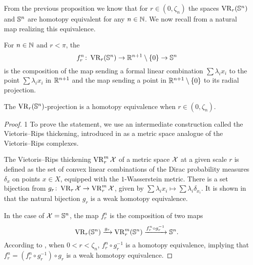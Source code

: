 From the previous proposition we know that for \(r \in (0, \zeta_n)\) the spaces \(\operatorname{VR}_r(\mathbb{S}^n)\) and \(\mathbb{S}^n\) are homotopy equivalent for any \(n \in \mathbb{N}\).
We now recall from \cite{bibid} a natural map realizing this equivalence.

For \(n \in \mathbb{N}\) and \(r < \pi\), the 
\[
f_r^n \colon \operatorname{VR}_r(\mathbb{S}^n) \to \mathbb{R}^{n+1} \setminus \{0\} \to \mathbb{S}^n
\]
is the composition of the map sending a formal linear combination $\sum\lambda_i x_i$ to the point \(\sum\lambda_i x_i\) in \(\mathbb{R}^{n+1}\) and the map sending a point in \(\mathbb{R}^{n+1} \setminus \{0\}\) to its radial projection.

\medskip\proposition
The \(\operatorname{VR}_r(\mathbb{S}^n)\)-projection is a homotopy equivalence when $r \in (0, \zeta_n)$.

\begin{proof}1
	To prove the statement, we use an intermediate construction called the Vietoris--Rips thickening, introduced in \cite{adamaszek2018metric} as a metric space analogue of the Vietoris--Rips complexes.

	The Vietoris--Rips thickening $\operatorname{VR}_r^m\mathcal{X}$ of a metric space $\mathcal{X}$ at a given scale $r$ is defined as the set of convex linear combinations of the Dirac probability measures $\delta_{x}$ on points $x \in X$, equipped with the $1$-Wasserstein metric.
	There is a set bijection from $g_r \colon \operatorname{VR}_r\mathcal{X} \to \operatorname{VR}_r^m\mathcal{X}$, given by $\sum \lambda_i x_i \mapsto \sum \lambda_i \delta_{x_i}.$
	It is shown in \cite[Theorem 1]{gillespie2024vietoris} that the natural bijection $g_r$ is a weak homotopy equivalence.

	In the case of $\mathcal{X} = \mathbb{S}^n$, the map $f_r^n$ is the composition of two maps
	\[
	\operatorname{VR}_r(\mathbb{S}^n) \xrightarrow{g_r} \operatorname{VR}_r^m(\mathbb{S}^n) \xrightarrow{f_r^n \circ g_r^{-1}} \mathbb{S}^n.
	\]
	According to \cite[Proposition 5.3]{adamaszek2018metric}, when $0<r<\zeta_n$, $f_r^n \circ g_r^{-1}$ is a homotopy equivalence, implying that $f_r^n = (f_r^n \circ g_r^{-1}) \circ g_r$ is a weak homotopy equivalence.
\end{proof}


